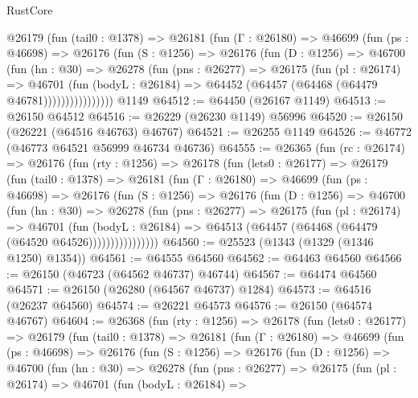 \begin{lexlean}{RustCore}
\begin{coremodule}
          @26179
            (fun (tail0 : @1378) =>
            @26181
              (fun (Γ : @26180) =>
              @46699
                (fun (ps : @46698) =>
                @26176
                  (fun (S : @1256) =>
                  @26176
                    (fun (D : @1256) =>
                    @46700
                      (fun (hn : @30) =>
                      @26278
                        (fun (pns : @26277) =>
                        @26175
                          (fun (pl : @26174) =>
                          @46701
                            (fun (bodyL : @26184) =>
                            @64452 (@64457 (@64468 (@64479 @46781))))))))))))))))
    @1149
@64512 := @64450 (@26167 @1149)
@64513 := @26150 @64512
@64516 := @26229 (@26230 @1149) @56996
@64520 := @26150 (@26221 (@64516 @46763) @46767)
@64521 := @26255 @1149
@64526 := @46772 (@46773 @64521 @56999 @46734 @46736)
@64555 := @26365
    (fun (rc : @26174) =>
    @26176
      (fun (rty : @1256) =>
      @26178
        (fun (lets0 : @26177) =>
        @26179
          (fun (tail0 : @1378) =>
          @26181
            (fun (Γ : @26180) =>
            @46699
              (fun (ps : @46698) =>
              @26176
                (fun (S : @1256) =>
                @26176
                  (fun (D : @1256) =>
                  @46700
                    (fun (hn : @30) =>
                    @26278
                      (fun (pns : @26277) =>
                      @26175
                        (fun (pl : @26174) =>
                        @46701
                          (fun (bodyL : @26184) =>
                          @64513 (@64457 (@64468 (@64479 (@64520 @64526))))))))))))))))
@64560 := @25523 (@1343 (@1329 (@1346 @1250) @1354))
@64561 := @64555 @64560
@64562 := @64463 @64560
@64566 := @26150 (@46723 (@64562 @46737) @46744)
@64567 := @64474 @64560
@64571 := @26150 (@26280 (@64567 @46737) @1284)
@64573 := @64516 (@26237 @64560)
@64574 := @26221 @64573
@64576 := @26150 (@64574 @46767)
@64604 := @26368
    (fun (rty : @1256) =>
    @26178
      (fun (lets0 : @26177) =>
      @26179
        (fun (tail0 : @1378) =>
        @26181
          (fun (Γ : @26180) =>
          @46699
            (fun (ps : @46698) =>
            @26176
              (fun (S : @1256) =>
              @26176
                (fun (D : @1256) =>
                @46700
                  (fun (hn : @30) =>
                  @26278
                    (fun (pns : @26277) =>
                    @26175
                      (fun (pl : @26174) =>
                      @46701
                        (fun (bodyL : @26184) =>

\end{coremodule}
\end{lexlean}

